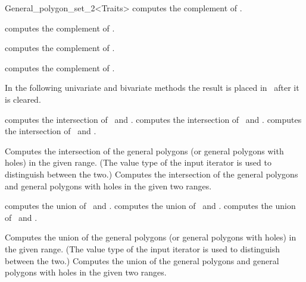 \begin{ccRefClass}{General_polygon_set_2<Traits>}
  {computes the complement of \ccVar.}

  {computes the complement of .}

  {computes the complement of .}
  
  {computes the complement of .}

In the following univariate and bivariate methods the result is placed in
\ccVar\ after it is cleared.

  {computes the intersection of \ccVar\ and .}
\ccGlue
{}
  {computes the intersection of \ccVar\ and .}
\ccGlue
{}
  {computes the intersection of \ccVar\ and .}

  {Computes the intersection of the general polygons (or general
  polygons with holes) in the given range. (The value type of the
  input iterator is used to distinguish between the two.)}
\ccGlue
{}
{Computes the intersection of the general polygons and general polygons
with holes in the given two ranges.}

  {computes the union of \ccVar\ and .}
\ccGlue
{}
  {computes the union of \ccVar\ and .}
\ccGlue
{}
  {computes the union of \ccVar\ and .}

  {Computes the union of the general polygons (or general
  polygons with holes) in the given range. (The value type of the
  input iterator is used to distinguish between the two.)}
\ccGlue
{}
{Computes the union of the general polygons and general polygons
with holes in the given two ranges.}


\end{ccRefClass}
